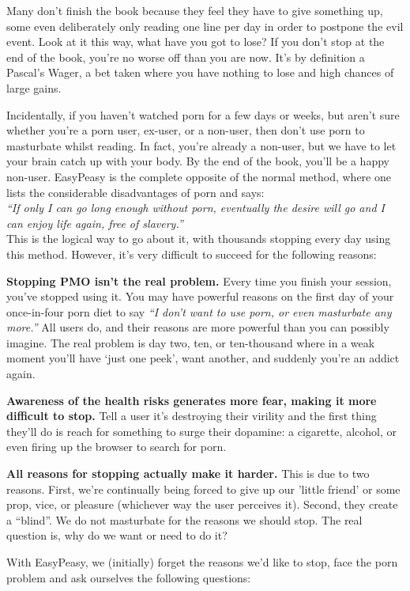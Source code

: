 \documentclass[
]{book}
\begin{document}
Many don't finish the book because they feel they have to give something up, some even deliberately only reading one line per day in order to postpone the evil event. Look at it this way, what have you got to lose? If you don't stop at the end of the book, you're no worse off than you are now. It's by definition a Pascal's Wager, a bet taken where you have nothing to lose and high chances of large gains.

Incidentally, if you haven't watched porn for a few days or weeks, but aren't sure whether you're a porn user, ex-user, or a non-user, then don't use porn to masturbate whilst reading. In fact, you're already a non-user, but we have to let your brain catch up with your body. By the end of the book, you'll be a happy non-user. EasyPeasy is the complete opposite of the normal method, where one lists the considerable disadvantages of porn and says:\\
\emph{``If only I can go long enough without porn, eventually the desire will go and I can enjoy life again, free of slavery.''}\\
This is the logical way to go about it, with thousands stopping every day using this method. However, it's very difficult to succeed for the following reasons:

\textbf{Stopping PMO isn't the real problem.}
Every time you finish your session, you've stopped using it. You may have powerful reasons on the first day of your once-in-four porn diet to say \emph{``I don't want to use porn, or even masturbate any more.''} All users do, and their reasons are more powerful than you can possibly imagine. The real problem is day two, ten, or ten-thousand where in a weak moment you'll have `just one peek', want another, and suddenly you're an addict again.

\textbf{Awareness of the health risks generates more fear, making it more difficult to stop.}
Tell a user it's destroying their virility and the first thing they'll do is reach for something to surge their dopamine: a cigarette, alcohol, or even firing up the browser to search for porn.

\textbf{All reasons for stopping actually make it harder.}
This is due to two reasons. First, we're continually being forced to give up our 'little friend' or some prop, vice, or pleasure (whichever way the user perceives it). Second, they create a ``blind''. We do not masturbate for the reasons we should stop. The real question is, why do we want or need to do it?

With EasyPeasy, we (initially) forget the reasons we'd like to stop, face the porn problem and ask ourselves the following questions:
\end{document}
